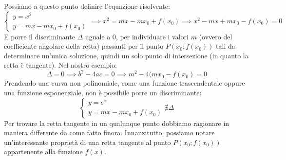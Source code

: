 \documentclass{report}
\begin{document}
Possiamo a questo punto definire l'equazione risolvente:
\begin{equation*}
	\begin{cases}
		y = x^2 \\
		y = mx - mx_0 + f(x_0)
	\end{cases}
	\implies x^2 = mx - mx_0 + f(x_0) \implies x^2 - mx + mx_0 - f(x_0) = 0
\end{equation*}
E porre il discriminante $\Delta$ uguale a $0$, per individuare i valori $m$ (ovvero del coefficiente angolare della retta) passanti per il punto $P(x_0; f(x_0))$ tali da determinare un'unica soluzione, quindi un solo punto di intersezione (in quanto la retta è tangente). Nel nostro esempio:
\begin{equation*}
	\Delta = 0 \implies b^2 - 4ac = 0 \implies m^2 - 4(mx_0 - f(x_0) = 0
\end{equation*}
Prendendo una curva non polinomiale, come una funzione trascendentale oppure una funzione esponenziale, non è possibile porre un discriminante:
\begin{equation*}
\begin{cases}
	y = e^x \\
	y = mx - mx_0 + f(x_0)
\end{cases} \nexists \Delta
\end{equation*}
Per trovare la retta tangente in un qualunque punto dobbiamo ragionare in maniera differente da come fatto finora. Innanzitutto, possiamo notare un'interessante proprietà di una retta tangente al punto $P(x_0; f(x_0))$ appartenente alla funzione $f(x)$.
\begin{figure}[H]
	\centering
\end{figure}
\end{document}
